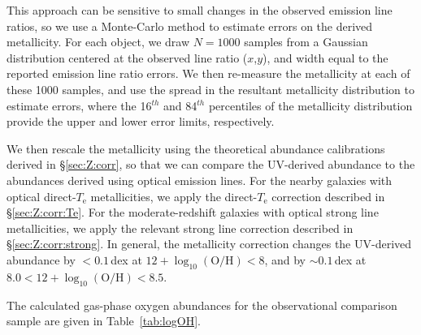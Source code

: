 \documentclass[trackchanges, preprint2]{aastex62}
\newcommand{\logten}{\ensuremath{\log_{10}}}
\newcommand{\logOH}{\ensuremath{\logten (\mathrm{O}/\mathrm{H})}\xspace}
\newcommand{\Te}{\ensuremath{T_{\mathrm{e}}}\xspace}
\begin{document}
This approach can be sensitive to small changes in the observed emission line ratios, so we use a Monte-Carlo method to estimate errors on the derived metallicity. For each object, we draw $N=1000$ samples from a Gaussian distribution centered at the observed line ratio ($x$,$y$), and width equal to the reported emission line ratio errors. We then re-measure the metallicity at each of these 1000 samples, and use the spread in the resultant metallicity distribution to estimate errors, where the 16$^{th}$ and 84$^{th}$ percentiles of the metallicity distribution provide the upper and lower error limits, respectively.

We then rescale the metallicity using the theoretical abundance calibrations derived in \S\ref{sec:Z:corr}, so that we can compare the UV-derived abundance to the abundances derived using optical emission lines. For the nearby galaxies with optical direct-\Te metallicities, we apply the direct-\Te correction described in \S\ref{sec:Z:corr:Te}. For the moderate-redshift galaxies with optical strong line metallicities, we apply the relevant strong line correction described in \S\ref{sec:Z:corr:strong}. In general, the metallicity correction changes the UV-derived abundance by $<0.1$\,dex at $12 + \logOH < 8$, and by ${\sim}0.1$\,dex at $8.0 < 12 + \logOH < 8.5$.

The calculated gas-phase oxygen abundances for the observational comparison sample are given in Table~\ref{tab:logOH}.
\end{document}

